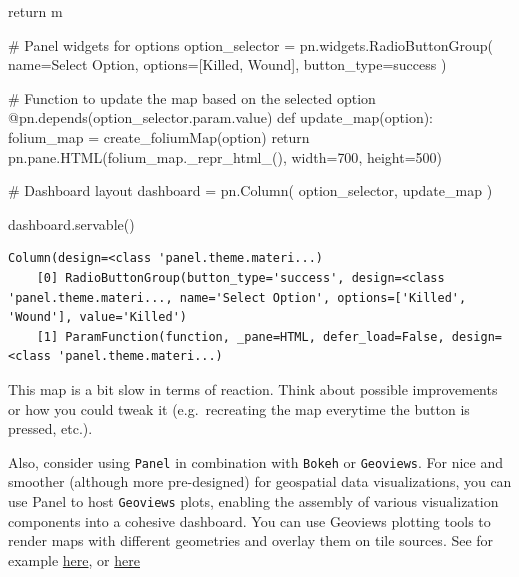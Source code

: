 \documentclass[
  letterpaper,
  DIV=11,
  numbers=noendperiod]{scrreprt}
\newenvironment{Shaded}{\begin{snugshade}}{\end{snugshade}}
\newcommand{\AttributeTok}[1]{\textcolor[rgb]{0.40,0.45,0.13}{#1}}
\newcommand{\CommentTok}[1]{\textcolor[rgb]{0.37,0.37,0.37}{#1}}
\newcommand{\ControlFlowTok}[1]{\textcolor[rgb]{0.00,0.23,0.31}{#1}}
\newcommand{\DecValTok}[1]{\textcolor[rgb]{0.68,0.00,0.00}{#1}}
\newcommand{\KeywordTok}[1]{\textcolor[rgb]{0.00,0.23,0.31}{#1}}
\newcommand{\NormalTok}[1]{\textcolor[rgb]{0.00,0.23,0.31}{#1}}
\newcommand{\OperatorTok}[1]{\textcolor[rgb]{0.37,0.37,0.37}{#1}}
\newcommand{\StringTok}[1]{\textcolor[rgb]{0.13,0.47,0.30}{#1}}
\begin{document}
\begin{Shaded}
\begin{Highlighting}[]
    \ControlFlowTok{return}\NormalTok{ m}

\CommentTok{\# Panel widgets for options}
\NormalTok{option\_selector }\OperatorTok{=}\NormalTok{ pn.widgets.RadioButtonGroup(}
\NormalTok{    name}\OperatorTok{=}\StringTok{\textquotesingle{}Select Option\textquotesingle{}}\NormalTok{, }
\NormalTok{    options}\OperatorTok{=}\NormalTok{[}\StringTok{\textquotesingle{}Killed\textquotesingle{}}\NormalTok{, }\StringTok{\textquotesingle{}Wound\textquotesingle{}}\NormalTok{], }
\NormalTok{    button\_type}\OperatorTok{=}\StringTok{\textquotesingle{}success\textquotesingle{}}
\NormalTok{)}
\end{Highlighting}
\end{Shaded}

\begin{Shaded}
\begin{Highlighting}[]
\CommentTok{\# Function to update the map based on the selected option}
\AttributeTok{@pn.depends}\NormalTok{(option\_selector.param.value)}
\KeywordTok{def}\NormalTok{ update\_map(option):}
\NormalTok{    folium\_map }\OperatorTok{=}\NormalTok{ create\_foliumMap(option)}
    \ControlFlowTok{return}\NormalTok{ pn.pane.HTML(folium\_map.\_repr\_html\_(), width}\OperatorTok{=}\DecValTok{700}\NormalTok{, height}\OperatorTok{=}\DecValTok{500}\NormalTok{)}

\CommentTok{\# Dashboard layout}
\NormalTok{dashboard }\OperatorTok{=}\NormalTok{ pn.Column(}
\NormalTok{    option\_selector,}
\NormalTok{    update\_map}
\NormalTok{)}

\NormalTok{dashboard.servable()}
\end{Highlighting}
\end{Shaded}

\begin{verbatim}
Column(design=<class 'panel.theme.materi...)
    [0] RadioButtonGroup(button_type='success', design=<class 'panel.theme.materi..., name='Select Option', options=['Killed', 'Wound'], value='Killed')
    [1] ParamFunction(function, _pane=HTML, defer_load=False, design=<class 'panel.theme.materi...)
\end{verbatim}

This map is a bit slow in terms of reaction. Think about possible
improvements or how you could tweak it (e.g.~recreating the map
everytime the button is pressed, etc.).

Also, consider using \texttt{Panel} in combination with \texttt{Bokeh}
or \texttt{Geoviews}. For nice and smoother (although more pre-designed)
for geospatial data visualizations, you can use Panel to host
\texttt{Geoviews} plots, enabling the assembly of various visualization
components into a cohesive dashboard. You can use Geoviews plotting
tools to render maps with different geometries and overlay them on tile
sources. See for example
\href{https://dmnfarrell.github.io/bioinformatics/bokeh-maps}{here}, or
\href{https://medium.com/@patohara60/interactive-mapping-in-python-with-uk-census-data-using-geoviews-and-panel-fcba3de07778}{here}
\end{document}
